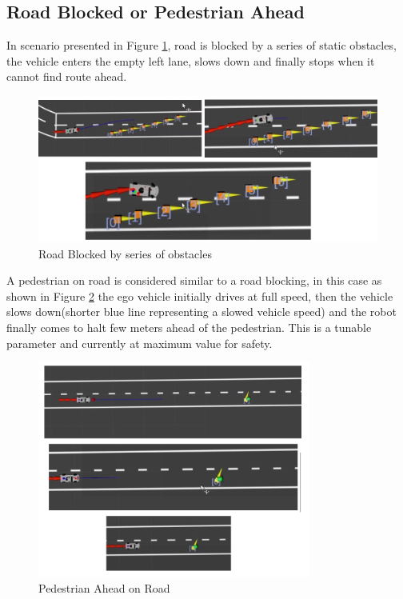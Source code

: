 \subsection{Road Blocked or Pedestrian Ahead}

In scenario presented in Figure \ref{road_blocked}, road is blocked by a series of static obstacles, the vehicle enters the empty left lane, slows down and finally stops when it cannot find route ahead. 

\begin{figure}[H]
    \centering
    \includegraphics[width=1.0\textwidth]{Images/evaluation/road_blocked1.jpg}
    \caption{Road Blocked by series of obstacles}
    \label{road_blocked}
\end{figure}

A pedestrian on road is considered similar to a road blocking, in this case as shown in Figure \ref{pedestrian_ahead} the ego vehicle initially drives at full speed, then the vehicle slows down(shorter blue line representing a slowed vehicle speed) and the robot finally comes to halt few meters ahead of the pedestrian. This is a tunable parameter and currently at maximum value for safety. 

\begin{figure}[H]
    \centering
    \includegraphics[width=0.8\textwidth]{Images/evaluation/pedestrian_ahead.jpg}
    \caption{Pedestrian Ahead on Road}
    \label{pedestrian_ahead}
\end{figure}

